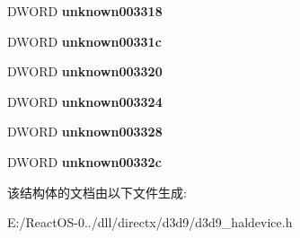 \begin{DoxyCompactItemize}
D\+W\+O\+RD {\bfseries unknown003318}
\item 
\mbox{\label{struct___d3_d9_h_a_l_d_e_v_i_c_e_add74d492af0548b2d5c91afd9ad8919f}} 
D\+W\+O\+RD {\bfseries unknown00331c}
\item 
\mbox{\label{struct___d3_d9_h_a_l_d_e_v_i_c_e_afeca335572adb05dfff0ab88f457f47a}} 
D\+W\+O\+RD {\bfseries unknown003320}
\item 
\mbox{\label{struct___d3_d9_h_a_l_d_e_v_i_c_e_a7d8ef96adddf1bc6ab1d5c48c44205fa}} 
D\+W\+O\+RD {\bfseries unknown003324}
\item 
\mbox{\label{struct___d3_d9_h_a_l_d_e_v_i_c_e_a96922956ab1d122b4eb050fec6d50493}} 
D\+W\+O\+RD {\bfseries unknown003328}
\item 
\mbox{\label{struct___d3_d9_h_a_l_d_e_v_i_c_e_af8771bc174f58f8e5e2482c3ff22f463}} 
D\+W\+O\+RD {\bfseries unknown00332c}
\end{DoxyCompactItemize}


该结构体的文档由以下文件生成\+:\begin{DoxyCompactItemize}
\item 
E\+:/\+React\+O\+S-\/0../dll/directx/d3d9/d3d9\+\_\+haldevice.\+h\end{DoxyCompactItemize}

